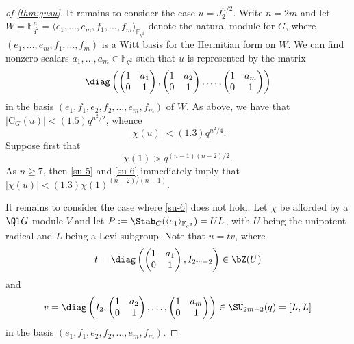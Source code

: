 \documentclass[eqthmnum,nocolour,skinny]{jt-calcs}
\newcommand{\CB}{\mathrm {C}}
\begin{document}
\begin{proof}[of \cref{thm:gusu}]
It remains to consider the case $u = J_2^{n/2}$. Write $n =2m$ and let $W = \mathbb{F}_{q^2}^n = \langle e_1, \ldots ,e_m,f_1, \ldots,f_m \rangle_{\mathbb{F}_{q^2}}$
denote the natural module for $G$, where $(e_1, \ldots,e_m,f_1, \ldots,f_m)$ is a Witt basis for the Hermitian form on $W$. 
We can find nonzero scalars $a_1, \ldots,a_m \in \mathbb{F}_{q^2}$ such that $u$ is represented by the matrix
\begin{equation*}
\diag \left( \begin{pmatrix}1 & a_1\\0 & 1 \end{pmatrix}, \begin{pmatrix}1 & a_2\\0 & 1 \end{pmatrix}, \ldots, \begin{pmatrix}1 & a_m\\0 & 1 \end{pmatrix}\right)
\end{equation*}
in the basis $(e_1,f_1,e_2,f_2, \ldots,e_m,f_m)$ of $W$. As above, we have that $|\CB_G(u)| < (1.5)q^{n^2/2}$, whence
\begin{equation}\label{su-5}
|\chi(u)| < (1.3)q^{n^2/4}.
\end{equation}
Suppose first that
\begin{equation}\label{su-6}
\chi(1) > q^{(n-1)(n-2)/2}.
\end{equation}
As $n \geq 7$, then \eqref{su-5} and \eqref{su-6} immediately imply that $|\chi(u)| < (1.3)\chi(1)^{(n-2)/(n-1)}$.

It remains to consider the case where \eqref{su-6} does not hold.
Let $\chi$ be afforded by a $\Ql G$-module $V$ and let $P := \Stab_G(\langle e_1 \rangle_{\mathbb{F}_{q^2}}) = UL$, with $U$ being the unipotent radical
and $L$ being a Levi subgroup. Note that $u=tv$, where
\begin{equation*}
t = \diag \left( \begin{pmatrix}1 & a_1\\0 & 1 \end{pmatrix}, I_{2m-2}\right) \in \bZ(U)
\end{equation*}
and
\begin{equation*}
v = \diag \left( I_2, \begin{pmatrix}1 & a_2\\0 & 1 \end{pmatrix}, \ldots, \begin{pmatrix}1 & a_m\\0 & 1 \end{pmatrix}\right) \in \SU_{2m-2}(q) = [L,L]
\end{equation*}
in the basis $(e_1,f_1,e_2,f_2, \ldots,e_m,f_m)$.


\end{proof}
\end{document}
